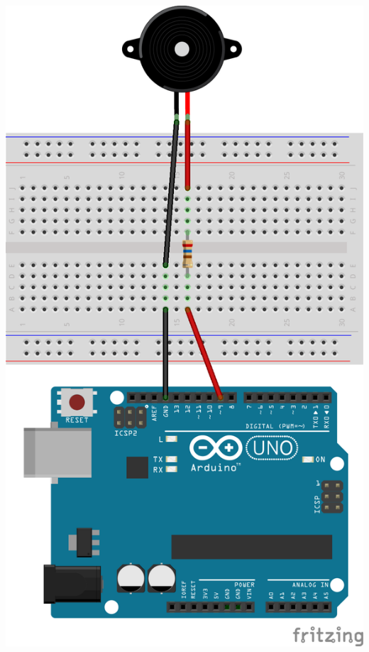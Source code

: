 \documentclass[12pt,a4paper]{article}
\begin{document}
\begin{center}
\includegraphics[scale=1, angle=-90]{fritzing/buzzer_bb.png}
\end{center}
\end{document}
